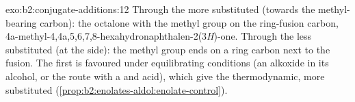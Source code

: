 \begin{solution}{exo:b2:conjugate-additions:12}
Through the more substituted  (towards the methyl-bearing carbon): the octalone with the methyl
group on the ring-fusion carbon, 4a-methyl-4,4a,5,6,7,8-hexahydronaphthalen-2(3\textit{H})-one. Through
the less substituted  (at the  side): the methyl group ends on a ring carbon next to the
fusion. The first is favoured under equilibrating conditions (an alkoxide in its alcohol, or the 
route with a  and acid), which give the thermodynamic, more substituted 
(\cref{prop:b2:enolates-aldol:enolate-control}).
\end{solution}

